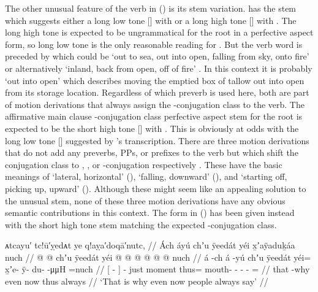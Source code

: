 The other unusual feature of the verb in (\lastx) is its stem variation.
\citeauthor{swanton:1909} has the stem  which suggests either a long low tone  [] with  or a long high tone  [] with .
The long high tone  is expected to be ungrammatical for the root  in a perfective aspect form, so long low tone  is the only reasonable reading for .
But the verb word is preceded by  which could be  ‘out to sea, out into open, falling from sky, onto fire’ or alternatively  ‘inland, back from open, off of fire’ \parencite[297]{leer:1991}.
In this context it is probably  ‘out into open’ which describes moving the emptied box of tallow out into open from its storage location.
Regardless of which preverb is used here, both are part of motion derivations that always assign the -conjugation class to the verb.
The affirmative main clause -conjugation class perfective aspect stem for the root  is expected to be the short high tone  [] with .
This is obviously at odds with the long low tone  [] suggested by \citeauthor{swanton:1909}’s transcription.
There are three motion derivations that do not add any preverbs, PPs, or prefixes to the verb  but which shift the conjugation class to , , or -conjugation respectively \parencite[306, 308, 309]{leer:1991}.
These have the basic meanings of ‘lateral, horizontal’ (), ‘falling, downward’ (), and ‘starting off, picking up, upward’ ().
Although these might seem like an appealing solution to the unusual stem, none of these three motion derivations have any obvious semantic contributions in this context.
The form in (\lastx) has been given instead with the short high tone  stem matching the expected -conjugation class.

\ex\label{ex:92-20-ppl-always-say}%
%
\begingl
	\glpreamble	ᴀtcayu′ tc!ū′ỵedᴀt ye q!aỵa′doqā′nutc, //
	\glpreamble	Ách áyú chʼu ÿeedát yéi x̱ʼaÿaduḵáa nuch //
	\gla	{}  @ {} {}  @ {}
		chʼu ÿeedát
		yéi @  @ {} @ {} @ {} @ {} @ \•nuch //
	\glb	{} á -ch {} á -yú
		chʼu ÿeedát
		yéi= x̱ʼe- ÿ- du-  -μμH =nuch //
	\glc	{}[  - {}]  -
		just moment
		thus= mouth- - -  - = //
	\gld	{} that -why {}  {}
		even now
		thus  {} {} {} {} \•always //
	\glft	‘That is why even now people always say’
		//
\endgl
\xe


